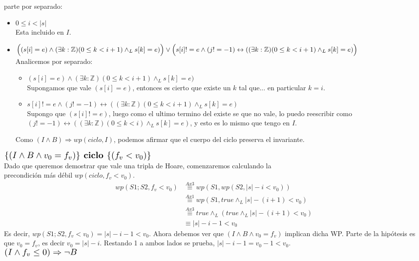 \documentclass[a4paper]{article}
\begin{document}
	parte por separado:
	\begin{itemize}
		\item $ 0\leq i<|s|$\smallskip \\
		Esta incluido en $I$.
		\item $\Big((s[i]=e)\wedge (\exists k:\mathbb{Z})(0\leq k<i+1)\wedge_L s[k]=e)\Big) \vee\\
   	\Big( s[i]!=e\wedge (j!=-1)\leftrightarrow ((\exists k:\mathbb{Z})(0\leq k<i+1)\wedge_L s[k]=e)\Big)$\smallskip \\
		Analicemos por separado:
		\begin{itemize}
		\item $(s[i]=e)\wedge (\exists k:\mathbb{Z})(0\leq k<i+1)\wedge_L s[k]=e)$\\
		Supongamos que vale $(s[i]=e)$, entonces es cierto que existe un $k$ tal que... en 
		particular $k=i$.
		\item  $s[i]!=e\wedge (j!=-1)\leftrightarrow ((\exists k:\mathbb{Z})(0\leq k<i+1)\wedge_L s[k]=e)$\\
		Supongo que $(s[i]!=e)$, luego como el ultimo termino del existe se que no vale, lo puedo reescribir como
			$ (j!=-1)\leftrightarrow ((\exists k:\mathbb{Z})(0\leq k<i)\wedge_L s[k]=e)$, y esto es lo mismo que tengo en $I$.
		\end{itemize}
		Como $(I\wedge B) \Rightarrow wp(ciclo,I)$, podemos afirmar que el cuerpo del ciclo preserva el invariante.
	\end{itemize}
	\noindent
	$\scalebox{1.3}{$\{(I\wedge B\wedge v_0=f_v)\}\textbf{ ciclo }\{(f_v<v_0)\}$}$\medskip \\
	Dado que queremos demostrar que vale una tripla de Hoare, comenzaremos calculando la\\ precondición más débil $wp(ciclo,f_v<v_0)$.
	\begin{align*}
		wp(S1;S2,f_v<v_0)&\stackrel{Ax3}{\equiv}wp(S1,wp(S2,|s|-i<v_0))\\
			&\stackrel{Ax1}{\equiv}wp(S1,true\wedge_L |s|-(i+1)<v_0)\\
			&\stackrel{Ax3}{\equiv}true\wedge_L(true\wedge_L  |s|-(i+1)<v_0)\\
			&\equiv |s|-i-1<v_0
	\end{align*}
	Es decir, $wp(S1;S2,f_v<v_0)=|s|-i-1<v_0$. Ahora debemos ver que $(I\wedge B\wedge v_0=f_v)$ implican dicha WP. Parte de la 
	hipótesis es que $v_0=f_v$, es decir $v_0=|s|-i$. Restando 1 a ambos lados se prueba, $|s|-i-1=v_0-1<v_0$.\medskip \\
	$\scalebox{1.3}{$(I\wedge f_v\leq 0)\Rightarrow \neg B$}$\medskip\\
\end{document}
